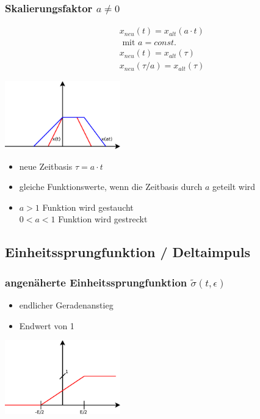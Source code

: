 \subsubsection*{Skalierungsfaktor \texorpdfstring{$a \neq 0$}{}}
\begin{multicols}{2}
\begin{align*}
  &x_{neu}\left(t\right) = x_{alt}\left(a \cdot t\right) \\
  &\text{ mit } a = const.\\
  &x_{neu}\left(t\right) = x_{alt}\left(\tau\right)\\
  &x_{neu}\left(\tau / a\right) = x_{alt}\left(\tau\right)
\end{align*}
\vfill
\begin{center}
 \includegraphics[width=50mm,keepaspectratio=true]{./Elektrotechnik/Bilder/skalierungsfaktor.pdf}
\end{center}

\end{multicols}
\begin{itemize}
 \item neue Zeitbasis \(\tau = a \cdot t\)
 \item gleiche Funktionswerte, wenn die Zeitbasis durch \(a\) geteilt wird
 \item \(a > 1\) Funktion wird gestaucht\\
       \(0 < a < 1\) Funktion wird gestreckt 
\end{itemize}

\subsection*{Einheitssprungfunktion / Deltaimpuls}
\subsubsection*{angenäherte Einheitssprungfunktion
\texorpdfstring{$\tilde{\sigma}\left(t, \epsilon \right)$}{}}
\begin{multicols}{2}
 \begin{itemize}
  \item endlicher Geradenanstieg
  \item Endwert von 1
 \end{itemize}
\vfill
\begin{center}
 \includegraphics[width=50mm,keepaspectratio=true]{./Elektrotechnik/Bilder/einheitssprungang.pdf}
\end{center}
\vfill
\end{multicols}

